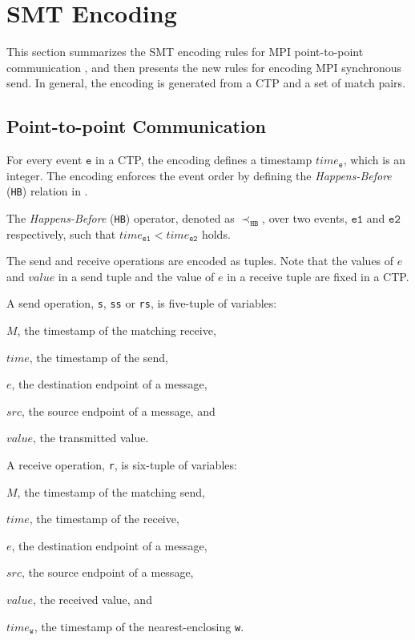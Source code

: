 \section{SMT Encoding}
This section summarizes the SMT encoding rules for MPI point-to-point communication \cite{}, and then presents the new rules for encoding MPI synchronous send. In general, the encoding is generated from a CTP and a set of match pairs.

\subsection{Point-to-point Communication}

For every event $\mathtt{e}$ in a CTP, the encoding defines a timestamp $\mathit{time}_\mathtt{e}$, which is an integer. The encoding enforces the event order by defining the \textit{Happens-Before} (\texttt{HB}) relation in .

\begin{definition}
The \textit{Happens-Before} (\texttt{HB}) operator, denoted as $\prec_\mathtt{HB}$, over two events, $\mathtt{e1}$ and $\mathtt{e2}$ respectively, such that $\mathit{time}_\mathtt{e1}<\mathit{time}_\mathtt{e2}$ holds.
\label{def:hb}
\end{definition}

The send and receive operations are encoded as tuples. Note that the values of $e$ and $\mathit{value}$ in a send tuple and the value of $e$ in a receive tuple are fixed in a CTP. 

\begin{definition}
A send operation, \texttt{s}, \texttt{ss} or \texttt{rs}, is five-tuple of variables:
\begin{compactenum}
\item $M$, the timestamp of the matching receive,
\item $\mathit{time}$, the timestamp of the send,
\item $e$, the destination endpoint of a message,
\item $\mathit{src}$, the source endpoint of a message, and
\item $\mathit{value}$, the transmitted value.
\end{compactenum}
\end{definition}

\begin{definition}
A receive operation, \texttt{r}, is six-tuple of variables:
\begin{compactenum}
\item $M$, the timestamp of the matching send,
\item $\mathit{time}$, the timestamp of the receive,
\item $e$, the destination endpoint of a message,
\item $\mathit{src}$, the source endpoint of a message, 
\item $\mathit{value}$, the received value, and
\item $\mathit{time}_\mathtt{w}$, the timestamp of the nearest-enclosing \texttt{w}.
\end{compactenum}
\label{def:receive}
\end{definition}

